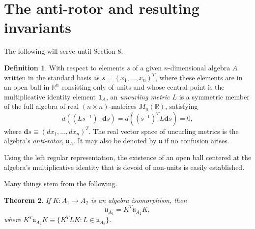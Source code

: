 \documentclass{amsart}
\newtheorem{theorem}{Theorem}
\theoremstyle{definition}
\newtheorem{definition}[theorem]{Definition}
\numberwithin{theorem}{section}
\numberwithin{equation}{section}
\begin{document}
\section{The anti-rotor and resulting invariants} The following will serve until Section 8. 
     \begin{definition}\label{7/21/23.1} With respect to elements $s$ of a given $n$-dimensional algebra $A$ written in the standard basis as $s= (x_1,\dots,x_n)^T$, where these elements are in an open ball in $\mathbb{R}^n$ consisting only of units and whose central point is the multiplicative identity element $\mathbf{1}_A$, an {\it uncurling metric $L$} is a symmetric member of the full algebra of real $(n\times n)$-matrices $M_n(\mathbb{R})$,  satisfying \begin{equation}\label{5/22/25.3} d\left((Ls^{-1})\cdot \mathbf{d}s\right) = d\left((s^{-1})^T L \mathbf{d}s\right) = 0, \end{equation} where $\mathbf{d}s \equiv (dx_1,\dots,dx_n)^T$.  The real vector space of uncurling metrics is the algebra's {\it anti-rotor}, $\mathfrak{u}_A$.  It may also be denoted by $\mathfrak{u}$ if no confusion arises.    \end{definition}
     
Using the left regular representation, the existence of an open ball centered at the algebra's multiplicative identity that is devoid of non-units is easily established. 

Many things stem from the following.

  \begin{theorem} \label{6/6/23.1} If $K:A_1\rightarrow A_2$ is an algebra isomorphism, then \begin{equation}\label{5/23/23.1} \mathfrak{u}_{A_1} = K^T \mathfrak{u}_{A_2} K, \end{equation} 
   where $K^T \mathfrak{u}_{A_2} K \equiv \{K^T L K:L\in \mathfrak{u}_{A_2}\}$.
   \end{theorem}
\end{document}
